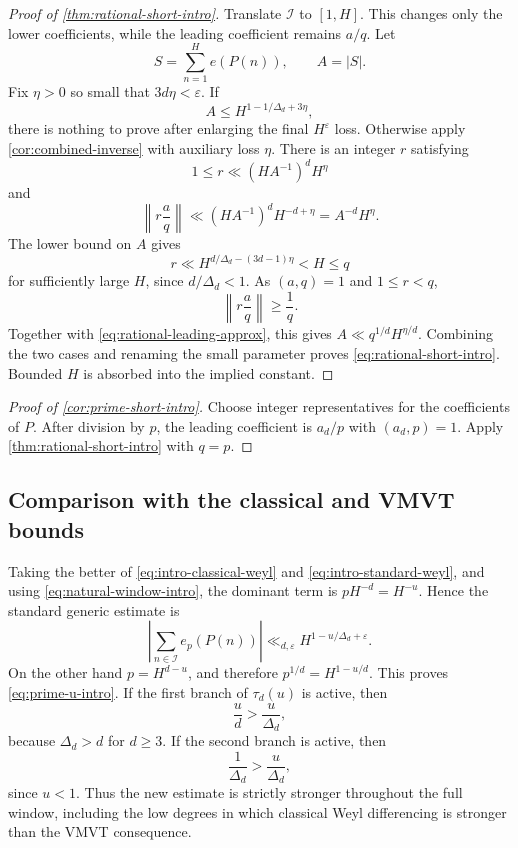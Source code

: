 \documentclass[11pt,reqno]{amsart}
\numberwithin{equation}{section}
\theoremstyle{definition}
\theoremstyle{remark}
\begin{document}
\begin{proof}[Proof of \cref{thm:rational-short-intro}]
Translate $\mathcal I$ to $[1,H]$.  This changes only the lower coefficients, while the leading coefficient remains $a/q$.  Let
\[
  S=\sum_{n=1}^{H}e(P(n)),
  \qquad A=|S|.
\]
Fix $\eta>0$ so small that $3d\eta<\varepsilon$.  If
\[
  A\le H^{1-1/\Delta_d+3\eta},
\]
there is nothing to prove after enlarging the final $H^\varepsilon$ loss.  Otherwise apply \cref{cor:combined-inverse} with auxiliary loss $\eta$.  There is an integer $r$ satisfying
\begin{equation}\label{eq:rational-r}
  1\le r\ll(HA^{-1})^dH^\eta
\end{equation}
and
\begin{equation}\label{eq:rational-leading-approx}
  \left\|r\frac aq\right\|
  \ll(HA^{-1})^dH^{-d+\eta}
  =A^{-d}H^\eta.
\end{equation}
The lower bound on $A$ gives
\[
  r\ll H^{d/\Delta_d-(3d-1)\eta}<H\le q
\]
for sufficiently large $H$, since $d/\Delta_d<1$.  As $(a,q)=1$ and $1\le r<q$,
\[
  \left\|r\frac aq\right\|\ge\frac1q.
\]
Together with \eqref{eq:rational-leading-approx}, this gives
$A\ll q^{1/d}H^{\eta/d}$.  Combining the two cases and renaming the small parameter proves \eqref{eq:rational-short-intro}.  Bounded $H$ is absorbed into the implied constant.
\end{proof}

\begin{proof}[Proof of \cref{cor:prime-short-intro}]
Choose integer representatives for the coefficients of $P$.  After division by $p$, the leading coefficient is $a_d/p$ with $(a_d,p)=1$.  Apply \cref{thm:rational-short-intro} with $q=p$.
\end{proof}

\subsection{Comparison with the classical and VMVT bounds}

Taking the better of \eqref{eq:intro-classical-weyl} and
\eqref{eq:intro-standard-weyl}, and using
\eqref{eq:natural-window-intro}, the dominant term is $pH^{-d}=H^{-u}$.
Hence the standard generic estimate is
\begin{equation}\label{eq:standard-u}
  \left|\sum_{n\in\mathcal I}e_p(P(n))\right|
  \ll_{d,\varepsilon}
  H^{1-u/\Delta_d+\varepsilon}.
\end{equation}
On the other hand $p=H^{d-u}$, and therefore
$p^{1/d}=H^{1-u/d}$.  This proves \eqref{eq:prime-u-intro}.  If the first
branch of $\tau_d(u)$ is active, then
\[
  \frac ud>\frac{u}{\Delta_d},
\]
because $\Delta_d>d$ for $d\ge3$.  If the second branch is active, then
\[
  \frac1{\Delta_d}>\frac{u}{\Delta_d},
\]
since $u<1$.  Thus the new estimate is strictly stronger throughout the full
window, including the low degrees in which classical Weyl differencing is
stronger than the VMVT consequence.
\end{document}
